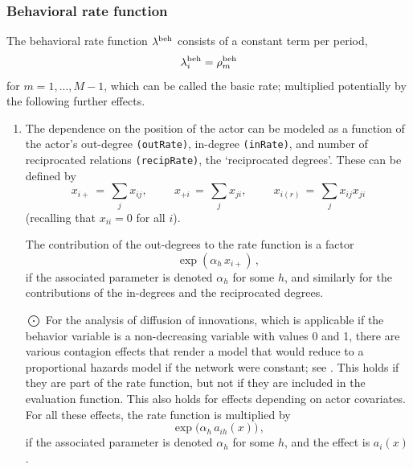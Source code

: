 \documentclass[a4paper,fleqn,11pt]{article}
\newcommand{\+}{\, + \,}
\begin{document}
\subsubsection{Behavioral rate function}
The behavioral rate function $\lambda^{\rm beh}$ consists of a
constant term per period, \[ \lambda^{\rm beh}_{i} = \rho^{\rm
beh}_m \] for $m = 1, ..., M-1$, which can be called the basic rate;
multiplied potentially by the following further effects.
\begin{enumerate}
 \item The dependence on the position of the actor can be modeled
 as a function of the actor's out-degree \texttt{(outRate)},
 in-degree \texttt{(inRate)}, and number
 of reciprocated relations \texttt{(recipRate)}, the `reciprocated degrees'.
 These can be defined by
 \[ x_{i+} \,=\, \sum_j x_{ij}, \phantom{abcde} x_{+i} \,=\, \sum_j x_{ji},
                \phantom{abcde} x_{i(r)} \,=\, \sum_j x_{ij}x_{ji} \]
 (recalling that $x_{ii} = 0$ for all $i$).

The contribution of the out-degrees to the rate function
is a factor
 \[ \exp( \alpha_h \, x_{i+})\,, \]
if the associated parameter is denoted $\alpha_h$ for some $h$,
and similarly for the contributions of the in-degrees and the
reciprocated degrees.

 \item[{\hspace*{-1ex}$\bigodot$}]
 For the analysis of diffusion of innovations,
  which is applicable if the behavior variable
  is a non-decreasing variable with values 0 and 1,
  there are various contagion effects that render a model that
  would reduce to a proportional hazards model if the network
  were constant; see \citet{Greenan14}.
  This holds if they are part of the rate function,
  but not if they are included in the evaluation function.
  This also holds for effects depending on actor covariates.
  For all these effects, the rate function is multiplied by
 \[ \exp\big( \alpha_h \, a_{ih}(x)\big)\,, \]
 if the associated parameter is denoted $\alpha_h$ for some $h$,
 and the effect is $a_i(x)$.




\end{enumerate}
\end{document}
